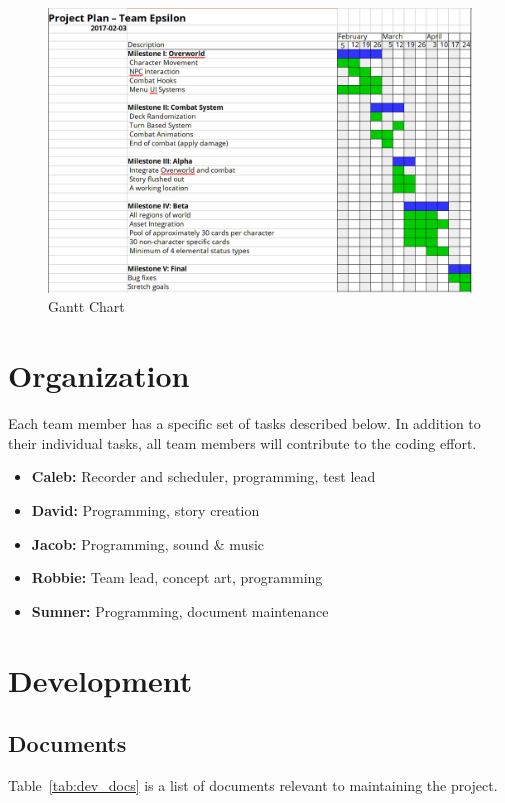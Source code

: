\documentclass[12pt,titlepage]{article}
\begin{document}
\begin{figure}[H]
    \caption{Gantt Chart}
    \label{fig:gantt}
    \centering
    \includegraphics[width=\textwidth]{gantt-chart}
\end{figure}

\section{Organization}
\label{sec:org}
Each team member has a specific set of tasks described below. In addition to
their individual tasks, all team members will contribute to the coding effort.
\begin{itemize}
    \item \textbf{Caleb:} Recorder and scheduler, programming, test lead
    \item \textbf{David:} Programming, story creation
    \item \textbf{Jacob:} Programming, sound \& music
    \item \textbf{Robbie:} Team lead, concept art, programming
    \item \textbf{Sumner:} Programming, document maintenance
\end{itemize}

\section{Development}
\label{sec:dev}

\subsection{Documents}

Table~\ref{tab:dev_docs} is a list of documents relevant to maintaining the project.
\end{document}
